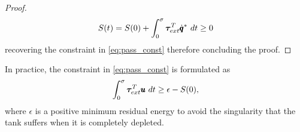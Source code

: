 \begin{proof}
\begin{equation} \label{eq:pass_cond}
    S(t) = S(0) + \int_{0}^{\sigma} \boldsymbol{\tau}_{ext}^T \dot{\pmb{q}}^* \ dt  \geq 0
\end{equation}
recovering the constraint in \eqref{eq:pass_const} therefore concluding the proof. 
\end{proof}
In practice, the constraint in \eqref{eq:pass_const} is formulated as
\begin{equation}
    \int_{0}^{\sigma} \boldsymbol{\tau}_{ext}^T \pmb{u} \ dt \geq \epsilon - S(0),
\end{equation}
where $\epsilon$ is a positive minimum residual energy to avoid the singularity that the tank suffers when it is completely depleted.  

